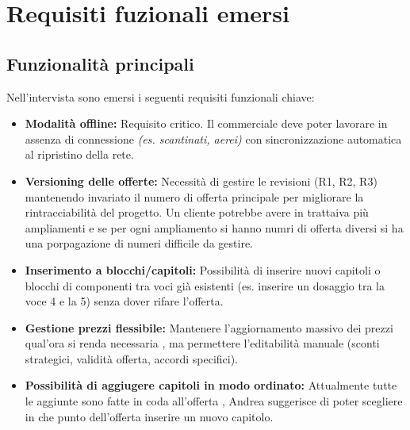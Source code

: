 \documentclass[12pt, a4paper]{article} %
\begin{document}
\section{Requisiti fuzionali emersi}

\subsection{Funzionalità principali}
Nell'intervista sono emersi i seguenti requisiti funzionali chiave:
\begin{itemize}
    \item \textbf{Modalità offline:} Requisito critico. Il commerciale deve poter lavorare in assenza di connessione \textit{(es. scantinati, aerei)} con sincronizzazione automatica al ripristino della rete.
    \item \textbf{Versioning delle offerte:} Necessità di gestire le revisioni (R1, R2, R3) mantenendo invariato il numero di offerta principale per migliorare la rintracciabilità del progetto. Un cliente potrebbe avere in trattaiva più ampliamenti e
          se per ogni ampliamento si hanno numri di offerta diversi si ha una porpagazione di numeri difficile da gestire.
    \item \textbf{Inserimento a blocchi/capitoli:} Possibilità di inserire nuovi capitoli o blocchi di componenti tra voci già esistenti (es. inserire un dosaggio tra la voce 4 e la 5) senza dover rifare l'offerta.
    \item \textbf{Gestione prezzi flessibile:} Mantenere l'aggiornamento massivo dei prezzi qual'ora si renda necessaria , ma permettere l'editabilità manuale (sconti strategici, validità offerta, accordi specifici).
    \item \textbf{Possibilità di aggiugere capitoli in modo ordinato:} Attualmente tutte le aggiunte sono fatte in coda all'offerta ,
          Andrea suggerisce di poter scegliere in che punto dell'offerta inserire un nuovo capitolo.
\end{itemize} 
\end{document}
